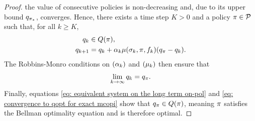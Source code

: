 \begin{proof}
the value of consecutive policies is non-decreasing and, due to its upper bound $q_{{\pi}_*}$, converges.
Hence, there exists a time step $K>0$ and a policy $\pi \in \mathcal{P}$ such that, for all $k \geq K$, 
\begin{align}
\label{eq: equivalent system on the long term on-pol}
    q_k &\in Q(\pi) ,
    \\
    q_{{k+1}}
    &=
    q_k + \alpha_k \mu(\sigma_k, \pi, f_k) ( q_\pi - q_k ) .
\end{align}
The Robbins-Monro conditions on $(\alpha_k)$ and $(\mu_k)$ then ensure that
\vspace{-0.1cm}
\begin{align}
\label{eq: convergence to qopt for exact mcopi}
    \lim_{k \to \infty} q_k = q_\pi .
\end{align}
% 
Finally, equations \eqref{eq: equivalent system on the long term on-pol} and \eqref{eq: convergence to qopt for exact mcopi} show that $q_\pi \in Q(\pi)$, meaning $\pi$ satisfies the Bellman optimality equation and is therefore optimal.
\end{proof}